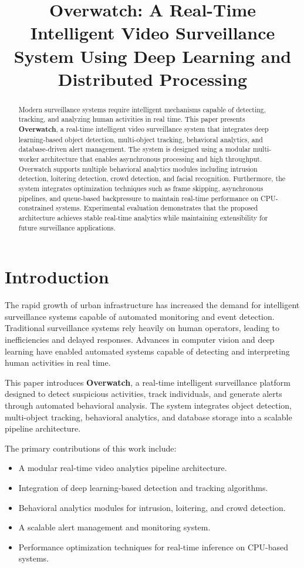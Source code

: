 \documentclass[conference]{IEEEtran}
\title{Overwatch: A Real-Time Intelligent Video Surveillance System Using Deep Learning and Distributed Processing}
\author{
\IEEEauthorblockN{Vishal Nyapathi}
\IEEEauthorblockA{Independent Researcher\\
Computer Vision and Intelligent Systems}
}
\begin{document}
\maketitle

\begin{abstract}
Modern surveillance systems require intelligent mechanisms capable of detecting, tracking, and analyzing human activities in real time. This paper presents \textbf{Overwatch}, a real-time intelligent video surveillance system that integrates deep learning-based object detection, multi-object tracking, behavioral analytics, and database-driven alert management. The system is designed using a modular multi-worker architecture that enables asynchronous processing and high throughput. Overwatch supports multiple behavioral analytics modules including intrusion detection, loitering detection, crowd detection, and facial recognition. Furthermore, the system integrates optimization techniques such as frame skipping, asynchronous pipelines, and queue-based backpressure to maintain real-time performance on CPU-constrained systems. Experimental evaluation demonstrates that the proposed architecture achieves stable real-time analytics while maintaining extensibility for future surveillance applications.
\end{abstract}

\section{Introduction}

The rapid growth of urban infrastructure has increased the demand for intelligent surveillance systems capable of automated monitoring and event detection. Traditional surveillance systems rely heavily on human operators, leading to inefficiencies and delayed responses. Advances in computer vision and deep learning have enabled automated systems capable of detecting and interpreting human activities in real time.

This paper introduces \textbf{Overwatch}, a real-time intelligent surveillance platform designed to detect suspicious activities, track individuals, and generate alerts through automated behavioral analysis. The system integrates object detection, multi-object tracking, behavioral analytics, and database storage into a scalable pipeline architecture.

The primary contributions of this work include:

\begin{itemize}
\item A modular real-time video analytics pipeline architecture.
\item Integration of deep learning-based detection and tracking algorithms.
\item Behavioral analytics modules for intrusion, loitering, and crowd detection.
\item A scalable alert management and monitoring system.
\item Performance optimization techniques for real-time inference on CPU-based systems.
\end{itemize}
\end{document}
